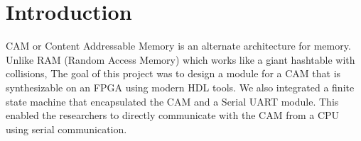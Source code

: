 \section{Introduction}
CAM or Content Addressable Memory is an alternate architecture for memory. Unlike RAM (Random Access Memory) which works like a giant hashtable with collisions,
The goal of this project was to design a module for a CAM that is synthesizable on an FPGA using modern HDL tools. 
We also integrated a finite state machine that encapsulated the CAM and a Serial UART module. 
This enabled the researchers to directly communicate with the CAM from a CPU using serial communication. 
